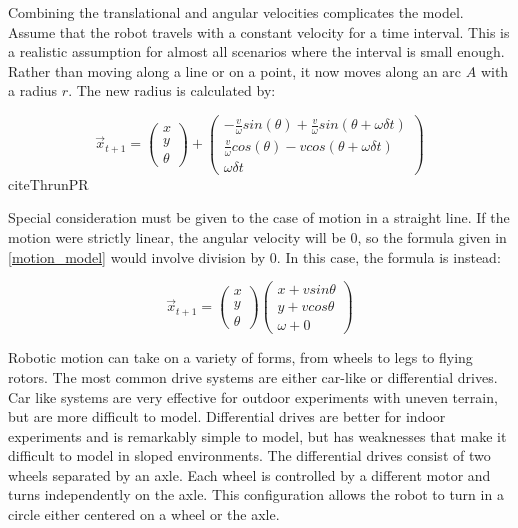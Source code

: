 \documentclass[12pt]{report}
\begin{document}
Combining the translational and angular velocities complicates the model.  Assume that the robot travels with a constant velocity for a time interval.  This is a realistic assumption for almost all scenarios where the interval is small enough.  Rather than moving along a line or on a point, it now moves along an arc $A$ with a radius $r$.  The new  radius is calculated by: 

\begin{equation}
\label{motion_model}
\vec{x}_{t+1}=
\begin{pmatrix}
 x \\
 y \\
\theta
\end{pmatrix}  +
\begin{pmatrix}
 -\frac{v}{\omega} sin(\theta)+\frac{v}{\omega} sin(\theta + \omega \delta t) \\
 \frac{v}{\omega} cos(\theta)-v cos(\theta + \omega \delta t)  \\
\omega \delta t
\end{pmatrix}
\end{equation}
cite{ThrunPR}

Special consideration must be given to the case of motion in a straight line.  If the motion were strictly linear, the angular velocity will be 0, so the formula given in \ref{motion_model} would involve division by 0.  In this case, the formula is instead:

\begin{equation}
\label{motion_linear}
\vec{x}_{t+1} =
\begin{pmatrix}
 x \\
 y \\
\theta
\end{pmatrix}
\begin{pmatrix}
 x + v sin \theta \\
 y + v cos \theta  \\
\omega + 0
\end{pmatrix}
\end{equation}

Robotic motion can take on a variety of forms, from wheels to legs to flying rotors.  The most common drive systems are either car-like or differential drives.  Car like systems are very effective for outdoor experiments with uneven terrain, but are more difficult to model.  Differential drives are better for indoor experiments and is remarkably simple to model, but has weaknesses that make it difficult to model in sloped environments.  The differential drives consist of two wheels separated by an axle.  Each wheel is controlled by a different motor and turns independently on the axle.  This configuration allows the robot to turn in a circle either centered on a wheel or the axle.  
\end{document}
